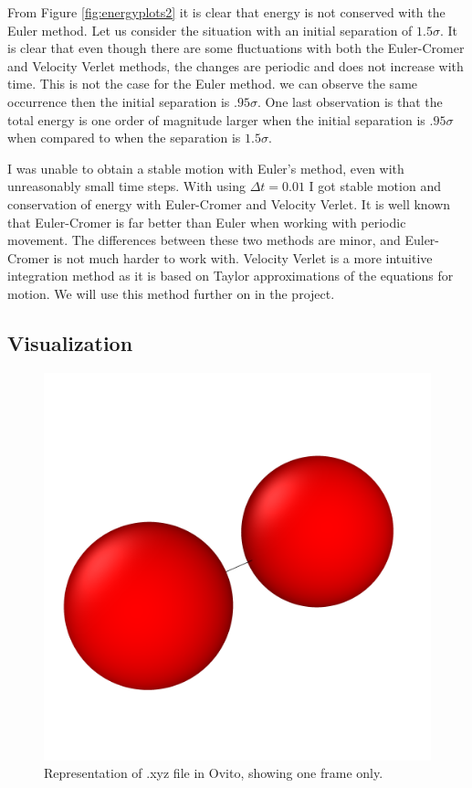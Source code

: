 \documentclass[a4paper,10pt,english]{article}
\begin{document}
From Figure \ref{fig:energyplots2} it is clear that energy is not conserved with the Euler method. Let us consider the situation with an initial separation of $1.5\sigma$. It is clear that even though there are some fluctuations with both the Euler-Cromer and Velocity Verlet methods, the changes are periodic and does not increase with time. This is not the case for the Euler method. we can observe the same occurrence then the initial separation is $.95\sigma$. One last observation is that the total energy is one order of magnitude larger when the initial separation is $.95\sigma$ when compared to when the separation is $1.5\sigma$.

I was unable to obtain a stable motion with Euler's method, even with unreasonably small time steps. With using $\Delta t = 0.01$ I got stable motion and conservation of energy with Euler-Cromer and Velocity Verlet. It is well known that Euler-Cromer is far better than Euler when working with periodic movement. The differences between these two methods are minor, and Euler-Cromer is not much harder to work with. Velocity Verlet is a more intuitive integration method as it is based on Taylor approximations of the equations for motion. We will use this method further on in the project.

\newpage

\subsection{Visualization} \label{2d}

\begin{figure} [h!]
    \centering
    \includegraphics[scale=0.25]{../figures/2_d_ii_1.png}
    \caption{Representation of .xyz file in Ovito, showing one frame only.}
    \label{fig:ovito1}
\end{figure}
\end{document}
